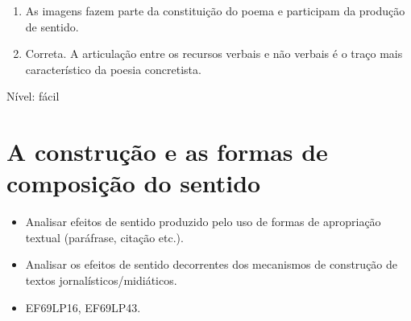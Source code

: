 {\begin{enumerate}
\def\labelenumi{\arabic{enumi}.}
\item
  As imagens fazem parte da constituição do poema e participam da
  produção de sentido.
\item
  Correta. A articulação entre os recursos verbais e não verbais é o
  traço mais característico da poesia concretista.
\end{enumerate}

Nível: fácil


\chapter{A construção e as formas de composição do sentido}


\begin{itemize}
  
  \item Analisar efeitos de sentido produzido pelo uso de formas de apropriação 
  textual (paráfrase, citação etc.).
  
  \item Analisar os efeitos de sentido decorrentes dos mecanismos de construção 
  de textos jornalísticos/midiáticos.

\end{itemize}


\begin{itemize}

  \item EF69LP16, EF69LP43.

\end{itemize}

}
